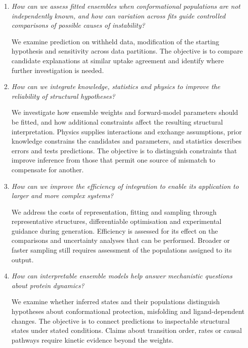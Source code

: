 \begin{enumerate}
    \item \textit{How can we assess fitted ensembles when conformational populations are not independently known, and how can variation across fits guide controlled comparisons of possible causes of instability?}

    We examine prediction on withheld data, modification of the starting hypothesis and sensitivity across data partitions. The objective is to compare candidate explanations at similar uptake agreement and identify where further investigation is needed.

    \item \textit{How can we integrate knowledge, statistics and physics to improve the reliability of structural hypotheses?}

    We investigate how ensemble weights and forward-model parameters should be fitted, and how additional constraints affect the resulting structural interpretation. Physics supplies interactions and exchange assumptions, prior knowledge constrains the candidates and parameters, and statistics describes errors and tests predictions. The objective is to distinguish constraints that improve inference from those that permit one source of mismatch to compensate for another.

    \item \textit{How can we improve the efficiency of integration to enable its application to larger and more complex systems?}

    We address the costs of representation, fitting and sampling through representative structures, differentiable optimisation and experimental guidance during generation. Efficiency is assessed for its effect on the comparisons and uncertainty analyses that can be performed. Broader or faster sampling still requires assessment of the populations assigned to its output.

    \item \textit{How can interpretable ensemble models help answer mechanistic questions about protein dynamics?}

    We examine whether inferred states and their populations distinguish hypotheses about conformational protection, misfolding and ligand-dependent changes. The objective is to connect predictions to inspectable structural states under stated conditions. Claims about transition order, rates or causal pathways require kinetic evidence beyond the weights.
\end{enumerate}

